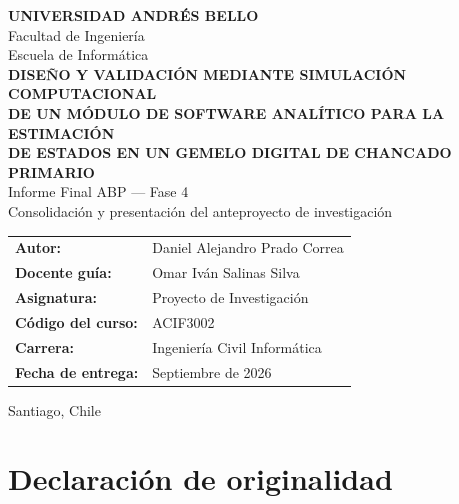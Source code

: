 \documentclass[12pt,letterpaper,oneside]{article}
\begin{document}
\begin{titlepage}
\centering
\singlespacing
\vspace*{1.0cm}

{\large\bfseries UNIVERSIDAD ANDRÉS BELLO}\\[0.3cm]
{\large Facultad de Ingeniería}\\[0.2cm]
{\large Escuela de Informática}\\[3.0cm]

{\large\bfseries
DISEÑO Y VALIDACIÓN MEDIANTE SIMULACIÓN COMPUTACIONAL\\[0.3cm]
DE UN MÓDULO DE SOFTWARE ANALÍTICO PARA LA ESTIMACIÓN\\[0.3cm]
DE ESTADOS EN UN GEMELO DIGITAL DE CHANCADO PRIMARIO}\\[0.8cm]

\vspace{0.8cm}
{\large Informe Final ABP --- Fase 4}\\[0.3cm]
{\large Consolidación y presentación del anteproyecto de investigación}\\[3.0cm]

\begin{flushleft}
\begin{tabular}{@{}ll@{}}
\textbf{Autor:} & Daniel Alejandro Prado Correa\\[0.25em]
\textbf{Docente guía:} & Omar Iván Salinas Silva\\[0.25em]
\textbf{Asignatura:} & Proyecto de Investigación\\[0.25em]
\textbf{Código del curso:} & ACIF3002\\[0.25em]
\textbf{Carrera:} & Ingeniería Civil Informática\\[0.25em]
\textbf{Fecha de entrega:} & Septiembre de 2026\\
\end{tabular}
\end{flushleft}

\vfill
{\large Santiago, Chile}
\end{titlepage}

\section*{Declaración de originalidad}
\end{document}
